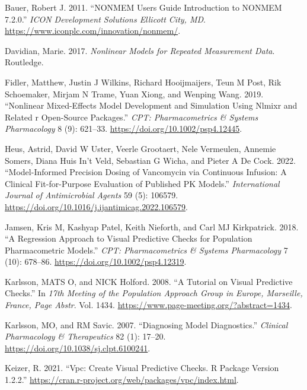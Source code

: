 \hypertarget{refs}{}
\begin{CSLReferences}{1}{0}
\leavevmode{}%
Bauer, Robert J. 2011. {``NONMEM Users Guide Introduction to NONMEM 7.2.0.''} \emph{ICON Development Solutions Ellicott City, MD}. \url{https://www.iconplc.com/innovation/nonmem/}.

\leavevmode{}%
Davidian, Marie. 2017. \emph{Nonlinear Models for Repeated Measurement Data}. Routledge.

\leavevmode{}%
Fidler, Matthew, Justin J Wilkins, Richard Hooijmaijers, Teun M Post, Rik Schoemaker, Mirjam N Trame, Yuan Xiong, and Wenping Wang. 2019. {``Nonlinear Mixed-Effects Model Development and Simulation Using Nlmixr and Related r Open-Source Packages.''} \emph{CPT: Pharmacometrics \& Systems Pharmacology} 8 (9): 621--33. \url{https://doi.org/10.1002/psp4.12445}.

\leavevmode{}%
Heus, Astrid, David W Uster, Veerle Grootaert, Nele Vermeulen, Annemie Somers, Diana Huis In't Veld, Sebastian G Wicha, and Pieter A De Cock. 2022. {``Model-Informed Precision Dosing of Vancomycin via Continuous Infusion: A Clinical Fit-for-Purpose Evaluation of Published PK Models.''} \emph{International Journal of Antimicrobial Agents} 59 (5): 106579. \url{https://doi.org/10.1016/j.ijantimicag.2022.106579}.

\leavevmode{}%
Jamsen, Kris M, Kashyap Patel, Keith Nieforth, and Carl MJ Kirkpatrick. 2018. {``A Regression Approach to Visual Predictive Checks for Population Pharmacometric Models.''} \emph{CPT: Pharmacometrics \& Systems Pharmacology} 7 (10): 678--86. \url{https://doi.org/10.1002/psp4.12319}.

\leavevmode{}%
Karlsson, MATS O, and NICK Holford. 2008. {``A Tutorial on Visual Predictive Checks.''} In \emph{17th Meeting of the Population Approach Group in Europe, Marseille, France, Page Abstr}. Vol. 1434. \url{https://www.page-meeting.org/?abstract=1434}.

\leavevmode{}%
Karlsson, MO, and RM Savic. 2007. {``Diagnosing Model Diagnostics.''} \emph{Clinical Pharmacology \& Therapeutics} 82 (1): 17--20. \url{https://doi.org/10.1038/sj.clpt.6100241}.

\leavevmode{}%
Keizer, R. 2021. {``Vpc: Create Visual Predictive Checks. R Package Version 1.2.2.''} \url{https://cran.r-project.org/web/packages/vpc/index.html}.


\end{CSLReferences}
